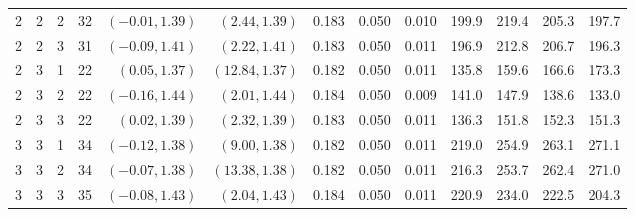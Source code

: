 \documentclass{article}
\numberwithin{equation}{section}
\theoremstyle{plain}
\begin{document}
\begin{sidewaystable}[htbp]
\begin{center}
\begin{tabular}{rrrrrrrrrrrrr}
			2 & 2 & 2 & 32 & $(-0.01, 1.39)$ & $(2.44, 1.39)$ & 0.183 & 0.050 & 0.010 & 199.9 & 219.4 & 205.3 & 197.7 \\
			2 & 2 & 3 & 31 & $(-0.09, 1.41)$ & $(2.22, 1.41)$ & 0.183 & 0.050 & 0.011 & 196.9 & 212.8 & 206.7 & 196.3 \\
			2 & 3 & 1 & 22 & $(0.05, 1.37)$ & $(12.84, 1.37)$ & 0.182 & 0.050 & 0.011 & 135.8 & 159.6 & 166.6 & 173.3 \\
			2 & 3 & 2 & 22 & $(-0.16, 1.44)$ & $(2.01, 1.44)$ & 0.184 & 0.050 & 0.009 & 141.0 & 147.9 & 138.6 & 133.0 \\
			2 & 3 & 3 & 22 & $(0.02, 1.39)$ & $(2.32, 1.39)$ & 0.183 & 0.050 & 0.011 & 136.3 & 151.8 & 152.3 & 151.3 \\
			3 & 3 & 1 & 34 & $(-0.12, 1.38)$ & $(9.00, 1.38)$ & 0.182 & 0.050 & 0.011 & 219.0 & 254.9 & 263.1 & 271.1 \\
			3 & 3 & 2 & 34 & $(-0.07, 1.38)$ & $(13.38, 1.38)$ & 0.182 & 0.050 & 0.011 & 216.3 & 253.7 & 262.4 & 271.0 \\
			3 & 3 & 3 & 35 & $(-0.08, 1.43)$ & $(2.04, 1.43)$ & 0.184 & 0.050 & 0.011 & 220.9 & 234.0 & 222.5 & 204.3 \\
			\hline
			\end{tabular}
	\end{center}
\end{sidewaystable}
\end{document}
